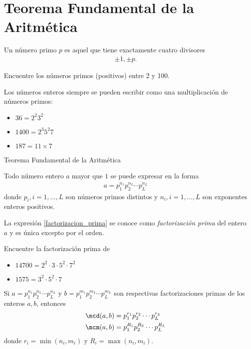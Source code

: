 \section{Teorema Fundamental de la Aritmética}

{}
Un número primo $p$ es aquel que tiene exactamente cuatro divisores
\begin{align*}
\pm 1, \pm p.
\end{align*}


{}
\begin{problema}
Encuentre los números primos (positivos) entre 2 y 100.
\end{problema}


{}
Los números enteros siempre se pueden escribir como una multiplicación de números primos:
\begin{itemize}
\item $36=2^{2}3^{2}$
\item $1400=2^{3}5^{2}7$
\item $187=11\times 7$
\end{itemize}


{Teorema Fundamental de la Aritmética}
\begin{teorema}
	Todo número entero $a$ mayor que $1$ se puede expresar en la forma
	\begin{align*}
		\label{factorizacion_prima}
		\tag{FP}
		a=p_{1}^{n_{1}}p_{2}^{n_{2}}\cdots p_{L}^{n_{L}}
	\end{align*}
	donde $p_{i}, i=1,...,L$ son números primos distintos y $n_{i}, i=1,...,L$ son exponentes enteros positivos. 
\end{teorema}

\begin{observacion}
	La expresión \ref{factorizacion_prima} se conoce como \emph{factorización prima} del entero $a$ y es única excepto por el orden.
\end{observacion}

{}
Encuentre la factorización prima de 
\begin{itemize}
\item $14700 = 2^{2}\cdot 3 \cdot 5^{2} \cdot 7^{2}$
\item $1575 = 3^{2}\cdot 5^{2} \cdot 7$
\end{itemize}


{}
\begin{proposicion}
	Si $a=p_{1}^{n_{1}}p_{2}^{n_{2}}\cdots p_{L}^{n_{L}}$ y $b=p_{1}^{m_{1}}p_{2}^{m_{2}}\cdots p_{L}^{m_{L}}$ son respectivas factorizaciones primas de los enteros $a,b$, entonces
	\begin{align*}
		\mcd(a,b) &= p_{1}^{r_{1}}p_{2}^{r_{2}}\cdots p_{L}^{r_{L}}\\
		\mcm(a,b) &= p_{1}^{R_{1}}p_{2}^{R_{2}}\cdots p_{L}^{R_{L}}
\end{align*}
donde $r_{i}=\min(n_{i},m_{i})$ y $R_{i}=\max(n_{i},m_{i}).$
\end{proposicion}


